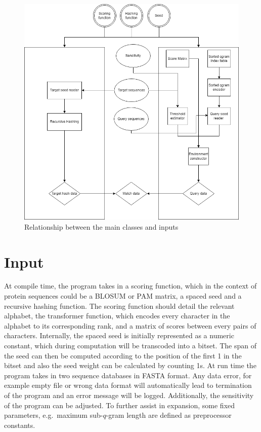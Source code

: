 \documentclass[twoside,a4paper,bsc]{master}
\newcommand{\Qgram}[1]{\(#1\)-gram}
\begin{document}
\begin{figure}[t]
\begin{center}
\includegraphics[scale=0.5]{graphics/Class_Diagram.png}
\end{center}
\caption{Relationship between the main classes and inputs}
\label{fig:classes}
\end{figure}
\section{Input}
At compile time, the program takes in a scoring function, which in the
context of protein sequences could be a BLOSUM or PAM matrix, a spaced seed
and a recursive hashing function. The scoring function should detail the
relevant alphabet, the transformer function, which encodes every character
in the alphabet to its corresponding rank, and a matrix of scores between
every pairs of characters. Internally, the spaced seed is initially
represented as a numeric constant, which during computation will be
transcoded into a bitset. The span of the seed can then be computed
according to the position of the first 1 in the bitset and also the seed
weight can be calculated by counting 1s.
At run time the program takes in two sequence databases in FASTA format.
Any data error, for example empty file or wrong data format will
automatically lead to termination of the program and an error message will
be logged. Additionally, the sensitivity of the program can be adjusted.
To further assist in expansion, some fixed parameters, e.g.\ maximum
sub-\Qgram{q} length are defined as preprocessor constants.
\end{document}
